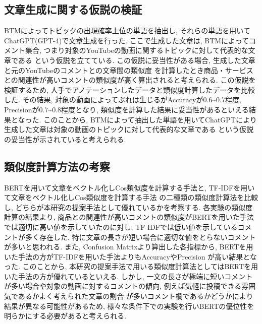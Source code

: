 \documentclass{ltjarticle}
\begin{document}
\subsection{文章生成に関する仮説の検証}
BTMによってトピックの出現確率上位の単語を抽出し, それらの単語を用いてChatGPT(GPT-4)で文章生成を行った. 
ここで生成した文章は, BTMによってコメント集合, つまり対象のYouTubeの動画に関するトピックに対して代表的な文章である
という仮説を立てている. この仮説に妥当性がある場合, 生成した文章と元のYouTubeのコメントとの文章間の類似度
を計算したとき商品・サービスとの関連性が高いコメントの類似度が高く算出されると考えられる. 
この仮説を検証するため, 人手でアノテーションしたデータと類似度計算したデータを比較した. 
その結果, 対象の動画によってぶれは生じるがAccuracyが0.6\sim0.7程度, Precisionが0.7\sim0.8程度となり, 
類似度を計算した結果に妥当性があるといえる結果となった. 
このことから, BTMによって抽出した単語を用いてChatGPTにより生成した文章は対象の動画のトピックに対して代表的な文章である
という仮説の妥当性が示されていると考えられる. 

\subsection{類似度計算方法の考察}
BERTを用いて文章をベクトル化しCos類似度を計算する手法と, TF-IDFを用いて文章をベクトル化しCos類似度を計算する手法
の二種類の類似度計算法を比較し, どちらが本研究の提案手法として優れているかを考察する. 
各実験の類似度計算の結果より, 商品との関連性が高いコメントの類似度がBERTを用いた手法では適切に高い値を示していたのに対し, 
TF-IDFでは低い値を示しているコメントが多く存在した. 特に文章の長さが短い場合に適切な値をとらないコメントが多いと思われる. 
また, Confusion Matrixより算出した各指標から, BERTを用いた手法の方がTF-IDFを用いた手法よりもAccuracyやPrecision
が高い結果となった. このことから, 本研究の提案手法で用いる類似度計算法としてはBERTを用いた手法の方が優れているといえる. 
しかし, 一文の長さが極端に短いコメントが多い場合や対象の動画に対するコメントの傾向, 例えば気軽に投稿できる雰囲気であるかよく考えられた文章の割合
が多いコメント欄であるかどうかにより結果が異なる可能性があるため, 様々な条件下での実験を行いBERTの優位性を明らかにする必要があると考えられる. 
\end{document}
